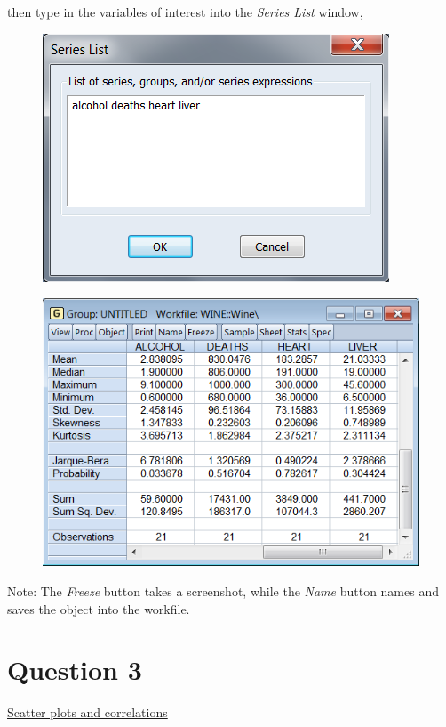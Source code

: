 \documentclass[12pt]{report}
\begin{document}
		\vspace{-\baselineskip}
		\noindent then type in the variables of interest into the \textit{Series List} window,
		\begin{figure}[H]
			\centerline{\includegraphics{q2_3}}
		\end{figure}		
		\vspace{-\baselineskip}
		\begin{figure}[H]
			\centerline{\includegraphics{dstat2}}
		\end{figure}	
		\vspace{-\baselineskip}
		\noindent Note: The \textit{Freeze} button takes a screenshot, while the \textit{Name} button names and saves the object into the workfile.

	\newpage	
	\section*{Question 3}
	\underline{Scatter plots and correlations}
		
\end{document}
